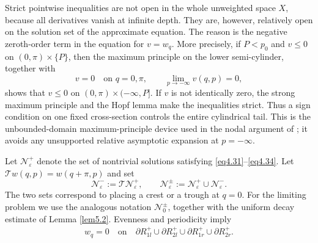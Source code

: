 \documentclass[11pt,reqno]{amsart}
\numberwithin{equation}{section}
\theoremstyle{definition}
\theoremstyle{remark}
\begin{document}
Strict pointwise inequalities are not open in the whole
unweighted space $X$, because all derivatives vanish at infinite
depth.  They are, however, relatively open on the solution set of
the approximate equation.  The reason is the negative zeroth-order
term in the equation for $v=w_q$.  More precisely, if $P<p_0$ and
$v\leq0$ on $(0,\pi)\times\{P\}$, then the maximum principle on the
lower semi-cylinder, together with
\[
 v=0\quad\text{on }q=0,\pi,
 \qquad \lim_{p\to-\infty}v(q,p)=0,
\]
shows that $v\leq0$ on $(0,\pi)\times(-\infty,P]$.  If $v$ is not
identically zero, the strong maximum principle and the Hopf lemma
make the inequalities strict.  Thus a sign condition on one fixed
cross-section controls the entire cylindrical tail.  This is the
unbounded-domain maximum-principle device used in the nodal argument
of \cite[Section 4.2]{Hur11}; it avoids any unsupported relative
asymptotic expansion at $p=-\infty$.

Let $\mathcal N_\varepsilon^+$ denote the set of nontrivial solutions
satisfying \eqref{eq4.31}--\eqref{eq4.34}.  Let
$\mathcal T w(q,p)=w(q+\pi,p)$ and set
\[
 \mathcal N_\varepsilon^-:=\mathcal T\mathcal N_\varepsilon^+,
 \qquad
 \mathcal N_\varepsilon^{\pm}
 :=\mathcal N_\varepsilon^+\cup\mathcal N_\varepsilon^-.
\]
The two sets correspond to placing a crest or a trough at $q=0$.
For the limiting problem we use the analogous notation
$\mathcal N_0^{\pm}$, together with the uniform decay estimate of
Lemma \ref{lem5.2}.  Evenness and periodicity imply
\begin{eqnarray}
w_q=0 \quad \text{on} \quad \partial R_{1l}^+\cup\partial
R_{2l}^+\cup \partial R_{1r}^+\cup\partial R_{2r}^+. \label{eq4.36}
\end{eqnarray}
\end{document}
